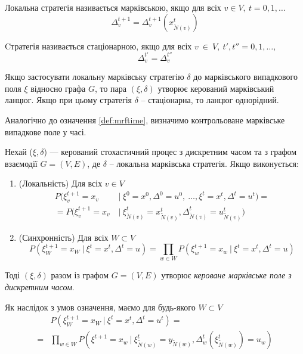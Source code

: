 \documentclass[oneside,14pt]{extarticle}
\begin{document}
\begin{definition}
Локальна стратегія називається марківською, якщо для всіх \(v \in V,\ t = 0, 1, \ldots\) 
\[\Delta_v^{t+1} = \Delta_v^{t+1}(x_{\tilde{N}(v)}^t)\]
\end{definition}

\begin{definition}
Cтратегія називається стаціонарною, якщо для всіх \(v~\in~V,\ t', t'' = 0, 1, \ldots,\)
\[\Delta_v^{t'} = \Delta_v^{t''}\]
\end{definition}

Якщо застосувати локальну марківську стратегію \(\delta\) до марківського випадкового поля \(\xi\) відносно графа \(G\), то пара \((\xi, \delta)\) утворює керований марківський ланцюг. Якщо при цьому стратегія \(\delta\) – стаціонарна, то ланцюг однорідний.

	Аналогічно до означення \ref{def:mrftime}, визначимо контрольоване марківське випадкове поле у часі.
	
\begin{definition}
\label{def:ctrlmrftime}
Нехай (\(\xi, \delta \)) — керований стохастичний процес з дискретним часом та з графом взаємодії \(G = (V, E)\), де \(\delta\) – локальна марківська стратегія. Якщо виконується:
\begin{enumerate}
    \item (Локальність) Для всіх \(v \in V\)
	\begin{align*}
    P(\xi_v^{t+1} = x_v\ &|\ \xi^0 = x^0, \Delta^0 = u^0,\ \ldots, \xi^t = x^t, \Delta^t = u^t) = \\
	= P(\xi_v^{t+1} = x_v\ &|\ \xi_{\tilde N(v)}^t = x_{\tilde N(v)}^t, \Delta_{\tilde N(v)}^t = u_{\tilde N(v)}^t)
	\end{align*}
	\item (Синхронність) Для всіх \(W \subset V\)
	\[P(\xi^{t+1}_W = x_W\ |\ \xi^t = x^t, \Delta^t = u) = \prod_{w \in W} P(\xi^{t+1}_w = x_w\ |\ \xi^t = x^t, \Delta^t = u) \]
\end{enumerate}
Тоді \((\xi, \delta)\) разом із графом \(G=(V,E)\) утворює \textit{кероване марківське поле з дискретним часом}.
\end{definition}

Як наслідок з умов означення, маємо для будь-якого \(W \subset V\)
\begin{align*}
&P(\xi_W^{t+1} = x_W\ |\ \xi^t = x^t, \Delta^t = u^t) = \\
= &\prod_{w \in W} P(\xi^{t+1} = x_w\ |\ \xi_{\tilde{N}(w)}^t = y_{\tilde{N}(w)}, \Delta_w^t(\xi_{\tilde{N}(w)}^t) = u_w)
\end{align*}
\end{document}
